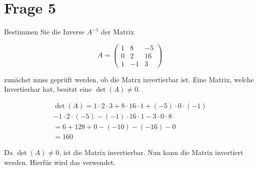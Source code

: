 \section{Frage 5}

Bestimmen Sie die Inverse $A^{-1}$ der Matrix

\[
    A = \begin{pmatrix}
        1 & 8  & -5 \\
        0 & 2  & 16 \\
        1 & -1 & 3
    \end{pmatrix}
\]

zunächst muss geprüft werden, ob die Matrx invertierbar ist. Eine Matrix,
welche Invertierhar hat, besitzt eine $\det(A) \neq 0$.

\begin{align*}
    \det(A) = 1 \cdot 2 \cdot 3 + 8 \cdot 16 \cdot 1 + (-5) \cdot 0 \cdot (-1) \\
    - 1 \cdot 2 \cdot (-5) - (-1) \cdot 16 \cdot 1 - 3 \cdot 0 \cdot 8         \\
    = 6 + 128 + 0 - (-10) - (-16) - 0                                          \\
    = 160
\end{align*}

Da $\det(A) \neq 0$, ist die Matrix invertierbar. Nun kann die Matrix
invertiert werden. Hierfür wird das  verwendet.

